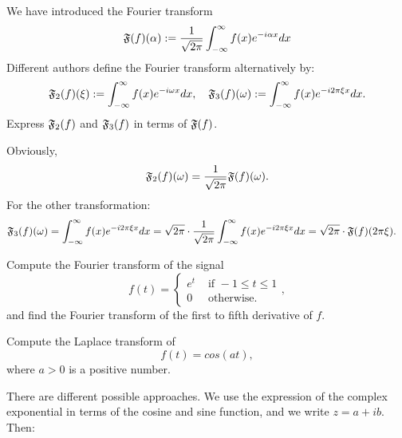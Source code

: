 \documentclass[11pt]{article}
\begin{document}
\begin{exercise}[Extra]
    We have introduced the Fourier transform 
    \begin{align*}
        \mathfrak{F}(f)(\alpha) := \frac{1}{\sqrt{2\pi}}\int_{-\infty}^{\infty} f(x) e^{-i \alpha x} dx
    \end{align*}
    Different authors define the Fourier transform alternatively by:
    \begin{align*}
        \mathfrak{F}_2(f)(\xi) 
        := \int_{-\infty}^{\infty} f(x) e^{-i \omega x} dx
        ,
        \quad 
        \mathfrak{F}_3(f)(\omega) 
        := \int_{-\infty}^{\infty} f(x) e^{-i 2\pi \xi x} dx
        .
    \end{align*}
    Express $\mathfrak{F}_{2}(f)$ and $\mathfrak{F}_{3}(f)$ in terms of $\mathfrak{F}(f)$.
\end{exercise}
\begin{solution}    
    Obviously, 
    \begin{align*}
        \mathfrak{F}_{2}(f)(\omega) = \frac{1}{\sqrt{2\pi}} \mathfrak{F}(f)(\omega).
    \end{align*}
    For the other transformation:
    \begin{align*}
        \mathfrak{F}_3(f)(\omega) 
        &
        = 
        \int_{-\infty}^{\infty} f(x) e^{-i 2\pi \xi x} dx
        = 
        \sqrt{2\pi} 
        \cdot 
        \frac{1}{\sqrt{2\pi}}
        \int_{-\infty}^{\infty} f(x) e^{-i 2\pi \xi x} dx
        = 
        \sqrt{2\pi} 
        \cdot 
        \mathfrak{F}(f)( 2\pi \xi )
        .
    \end{align*}
\end{solution}

\begin{exercise}
    Compute the Fourier transform of the signal 
    \[
        f(t) = \left\{\begin{array}{ll} e^{t} & \text{ if } -1 \leq t \leq 1 \\ 0 & \text{ otherwise. } \end{array}\right.,
    \]
    and find the Fourier transform of the first to fifth derivative of $f$. 
\end{exercise}
\begin{solution}     
\end{solution}

\begin{exercise}
    Compute the Laplace transform of 
    \[
        f(t) = cos( a t ),
    \]
    where $a > 0$ is a positive number. 
\end{exercise}
\begin{solution}     
    There are different possible approaches. We use the expression of the complex exponential in terms of the cosine and sine function, and we write $z = a + ib$. Then:
\end{solution}
\end{document}
